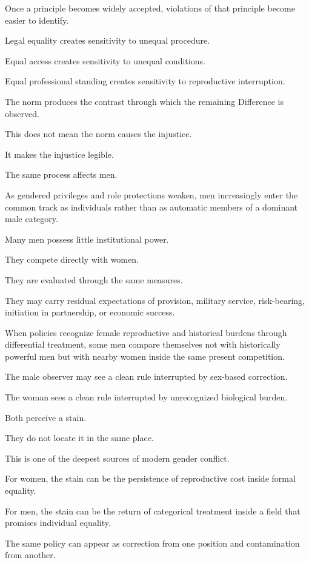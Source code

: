 Once a principle becomes widely accepted, violations of that principle become easier to identify.

Legal equality creates sensitivity to unequal procedure.

Equal access creates sensitivity to unequal conditions.

Equal professional standing creates sensitivity to reproductive interruption.

The norm produces the contrast through which the remaining Difference is observed.

This does not mean the norm causes the injustice.

It makes the injustice legible.

The same process affects men.

As gendered privileges and role protections weaken, men increasingly enter the common track as individuals rather than as automatic members of a dominant male category.

Many men possess little institutional power.

They compete directly with women.

They are evaluated through the same measures.

They may carry residual expectations of provision, military service, risk-bearing, initiation in partnership, or economic success.

When policies recognize female reproductive and historical burdens through differential treatment, some men compare themselves not with historically powerful men but with nearby women inside the same present competition.

The male observer may see a clean rule interrupted by sex-based correction.

The woman sees a clean rule interrupted by unrecognized biological burden.

Both perceive a stain.

They do not locate it in the same place.

This is one of the deepest sources of modern gender conflict.

For women, the stain can be the persistence of reproductive cost inside formal equality.

For men, the stain can be the return of categorical treatment inside a field that promises individual equality.

The same policy can appear as correction from one position and contamination from another.


